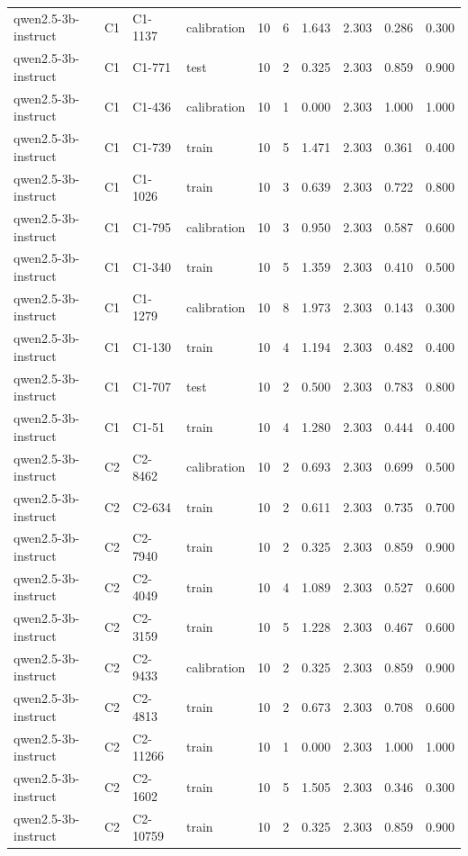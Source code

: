 \begin{table}
\begin{tabular}{llllrrrrrr}
qwen2.5-3b-instruct & C1 & C1-1137 & calibration & 10 & 6 & 1.643 & 2.303 & 0.286 & 0.300 \\
qwen2.5-3b-instruct & C1 & C1-771 & test & 10 & 2 & 0.325 & 2.303 & 0.859 & 0.900 \\
qwen2.5-3b-instruct & C1 & C1-436 & calibration & 10 & 1 & 0.000 & 2.303 & 1.000 & 1.000 \\
qwen2.5-3b-instruct & C1 & C1-739 & train & 10 & 5 & 1.471 & 2.303 & 0.361 & 0.400 \\
qwen2.5-3b-instruct & C1 & C1-1026 & train & 10 & 3 & 0.639 & 2.303 & 0.722 & 0.800 \\
qwen2.5-3b-instruct & C1 & C1-795 & calibration & 10 & 3 & 0.950 & 2.303 & 0.587 & 0.600 \\
qwen2.5-3b-instruct & C1 & C1-340 & train & 10 & 5 & 1.359 & 2.303 & 0.410 & 0.500 \\
qwen2.5-3b-instruct & C1 & C1-1279 & calibration & 10 & 8 & 1.973 & 2.303 & 0.143 & 0.300 \\
qwen2.5-3b-instruct & C1 & C1-130 & train & 10 & 4 & 1.194 & 2.303 & 0.482 & 0.400 \\
qwen2.5-3b-instruct & C1 & C1-707 & test & 10 & 2 & 0.500 & 2.303 & 0.783 & 0.800 \\
qwen2.5-3b-instruct & C1 & C1-51 & train & 10 & 4 & 1.280 & 2.303 & 0.444 & 0.400 \\
qwen2.5-3b-instruct & C2 & C2-8462 & calibration & 10 & 2 & 0.693 & 2.303 & 0.699 & 0.500 \\
qwen2.5-3b-instruct & C2 & C2-634 & train & 10 & 2 & 0.611 & 2.303 & 0.735 & 0.700 \\
qwen2.5-3b-instruct & C2 & C2-7940 & train & 10 & 2 & 0.325 & 2.303 & 0.859 & 0.900 \\
qwen2.5-3b-instruct & C2 & C2-4049 & train & 10 & 4 & 1.089 & 2.303 & 0.527 & 0.600 \\
qwen2.5-3b-instruct & C2 & C2-3159 & train & 10 & 5 & 1.228 & 2.303 & 0.467 & 0.600 \\
qwen2.5-3b-instruct & C2 & C2-9433 & calibration & 10 & 2 & 0.325 & 2.303 & 0.859 & 0.900 \\
qwen2.5-3b-instruct & C2 & C2-4813 & train & 10 & 2 & 0.673 & 2.303 & 0.708 & 0.600 \\
qwen2.5-3b-instruct & C2 & C2-11266 & train & 10 & 1 & 0.000 & 2.303 & 1.000 & 1.000 \\
qwen2.5-3b-instruct & C2 & C2-1602 & train & 10 & 5 & 1.505 & 2.303 & 0.346 & 0.300 \\
qwen2.5-3b-instruct & C2 & C2-10759 & train & 10 & 2 & 0.325 & 2.303 & 0.859 & 0.900 \\

\end{tabular}
\end{table}
